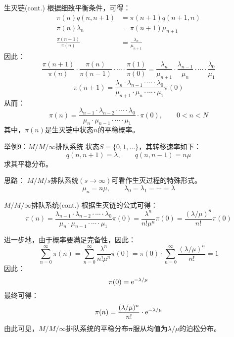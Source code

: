 \documentclass[t]{beamer}
\begin{document}
\begin{frame}{生灭链(cont.)}\small
  根据细致平衡条件，可得：
  \[\begin{split}
  \pi(n)q(n,n+1)&=\pi(n+1)q(n+1,n)\\
  \pi(n)\lambda_n&=\pi(n+1)\mu_{n+1}\\
  \frac{\pi(n+1)}{\pi(n)}&=\frac{\lambda_n}{\mu_{n+1}}
  \end{split} \]
  因此：\[
  \frac{\pi(n+1)}{\pi(n)}\cdot \frac{\pi(n)}{\pi(n-1)}\cdot \cdots\cdot \frac{\pi(1)}{\pi(0)}=\frac{\lambda_n}{\mu_{n+1}}\cdot \frac{\lambda_{n-1}}{\mu_{n}}\cdot \cdots\cdot \frac{\lambda_0}{\mu_{1}}\]
  \[\pi(n+1)=\frac{\lambda_n\cdot \lambda_{n-1}\cdot \cdots\cdot  \lambda_0}{\mu_{n+1}\cdot \mu_n\cdot\cdots\cdot\mu_1}\pi(0)
  \]
  从而：\begin{equation*}
  \pi(n)=\frac{\lambda_{n-1}\cdot \lambda_{n-2}\cdot \cdots\cdot  \lambda_0}{\mu_{n}\cdot \mu_{n-1}\cdot\cdots\cdot\mu_1}\cdot \pi(0),\qquad 0<n<N
  \end{equation*}
  其中，$\pi(n)$是生灭链中状态$n$的平稳概率。	
\end{frame}

\begin{frame}{举例9：$M/M/\infty$排队系统}
  状态$S=\{0,1,\ldots \}$，其转移速率如下：
  \[q(n,n+1)=\lambda,\qquad q(n,n-1)=n\mu \]
  求其平稳分布。

  \begin{block}{思路：}
    $M/M/s$排队系统$(s\to\infty)$可看作生灭过程的特殊形式。
    \[\mu_n=n\mu,\qquad \lambda_0=\lambda_1=\cdots=\lambda \]
  \end{block}
\end{frame}


\begin{frame}{$M/M/\infty$排队系统(cont.)}\small
  根据生灭链的公式可得：
  \[\pi(n)=\frac{\lambda_{n-1}\cdot \lambda_{n-2}\cdot\cdots \cdot\lambda_0}{\mu_{n}\cdot \mu_{n-1}\cdot\cdots\cdot\mu_1}\pi(0)=\frac{\lambda^n}{n!\mu^n}\pi(0)=\frac{(\lambda/\mu)^n}{n!}\pi(0)\]
  
  进一步地，由于概率要满足完备性，因此：
  \[\sum_{n=0}^{\infty} \pi(n)=\sum_{n=0}^{\infty}\frac{\lambda^n}{n!\mu^n}\pi(0)=\pi(0)\cdot \sum_{n=0}^{\infty} \frac{(\lambda/\mu)^n}{n!}=1 \]
  因此：$$\pi(0)={\rm e}^{-\lambda/\mu}$$ 最终可得：
  \[\pi(n)=\frac{(\lambda/\mu)^n}{n!}\cdot {\rm e}^{-\lambda/\mu}\]
  由此可见，$M/M/\infty$排队系统的平稳分布$\bm{\pi}$服从均值为$\lambda/\mu$的泊松分布。
\end{frame}
\end{document}
